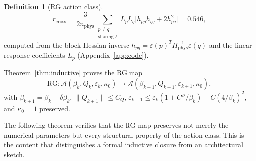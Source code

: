 \documentclass[11pt]{article}
\theoremstyle{definition}
\newtheorem{definition}[theorem]{Definition}
\begin{document}
\begin{definition}[RG action class]
\begin{equation}\label{eq:rcross}
r_{\mathrm{cross}}
=\frac{3}{2n_{\mathrm{phys}}}
\sum_{\substack{p\ne q\\\text{sharing }\ell}}
L_p L_q\bigl[h_{pp}h_{qq}+2h_{pq}^2\bigr]
=0.546,
\end{equation}
computed from the block Hessian inverse $h_{pq}=\varepsilon(p)^T
H_{\mathrm{phys}}^{-1}\varepsilon(q)$ and the linear response
coefficients $L_p$ (Appendix~\ref{app:code}).

Theorem~\ref{thm:inductive} proves the RG map
\begin{equation}
\mathrm{RG}\colon
\mathcal{A}(\beta_k,Q_k,\varepsilon_k,\kappa_0)
\to\mathcal{A}(\beta_{k+1},Q_{k+1},\varepsilon_{k+1},\kappa_0),
\end{equation}
with $\beta_{k+1}=\beta_k-\delta\beta_k$,
$\|Q_{k+1}\|\le C_Q$,
$\varepsilon_{k+1}\le\varepsilon_k(1+C''/\beta_k)+C(4/\beta_k)^2$,
and $\kappa_0=1$ preserved.

The following theorem verifies that the RG map preserves not merely
the numerical parameters but every structural property of the
action class.  This is the content that distinguishes a formal
inductive closure from an architectural sketch.
\end{definition}
\end{document}
